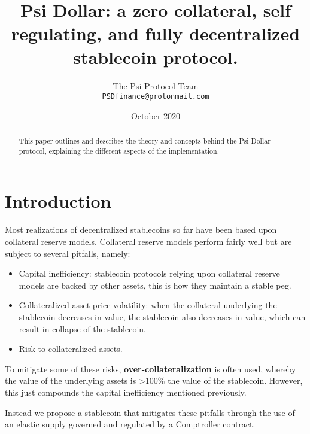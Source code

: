 \documentclass[a4paper, 12pt]{article}
\begin{document}
	\title{\Large{\textbf{Psi Dollar: a zero collateral, self regulating, and fully decentralized stablecoin protocol.}}}
	\author{The Psi Protocol Team \\ \texttt{PSDfinance@protonmail.com}}
	\date{October 2020}

	\maketitle

	\begin{abstract}
		This paper outlines and describes the theory and concepts behind the Psi Dollar protocol, explaining the different aspects of the implementation. 
	\end{abstract}

	\newpage
	
	\tableofcontents

	\newpage

	\section{Introduction}
	Most realizations of decentralized stablecoins so far have been based upon collateral reserve models. Collateral reserve models perform fairly well but are subject to several pitfalls, namely:
	
	\begin{itemize}
		
		\item{Capital inefficiency: stablecoin protocols relying upon collateral reserve models are backed by other assets, this is how they maintain a stable peg.}
		\item{Collateralized asset price volatility: when the collateral underlying the stablecoin decreases in value, the stablecoin also decreases in value, which can result in collapse of the stablecoin.}
		\item{Risk to collateralized assets.}
		
	\end{itemize}

	To mitigate some of these risks, \textbf{over-collateralization} is often used, whereby the value of the underlying assets is \textgreater100\% the value of the stablecoin. However, this just compounds 	the capital inefficiency mentioned previously. \newline
	

	Instead we propose a stablecoin that mitigates these pitfalls through the use of an elastic supply governed and regulated by a Comptroller contract.
\end{document}
